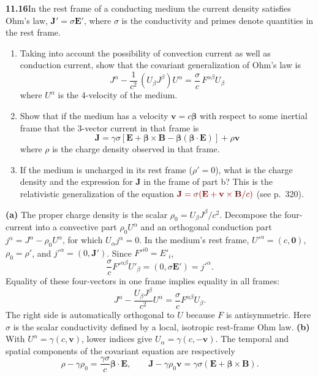 \par\bigskip
\noindent\textbf{11.16}\quad In the rest frame of a conducting medium the current density satisfies Ohm's law, $\mathbf{J}'=\sigma\mathbf{E}'$, where $\sigma$ is the conductivity and primes denote quantities in the rest frame.
\begin{enumerate}
\item[(a)] Taking into account the possibility of convection current as well as conduction current, show that the covariant generalization of Ohm's law is
\[
J^{\alpha}-\frac{1}{c^{2}}\,(U_{\beta}J^{\beta})U^{\alpha}=\frac{\sigma}{c}\,F^{\alpha\beta}U_{\beta}
\]
where $U^{\alpha}$ is the 4-velocity of the medium.
\item[(b)] Show that if the medium has a velocity $\mathbf{v}=c\boldsymbol{\beta}$ with respect to some inertial frame that the 3-vector current in that frame is
\[
\mathbf{J}=\gamma\sigma[\mathbf{E}+\boldsymbol{\beta}\times\mathbf{B}-\boldsymbol{\beta}(\boldsymbol{\beta}\cdot\mathbf{E})]+\rho\mathbf{v}
\]
where $\rho$ is the charge density observed in that frame.
\item[(c)] If the medium is uncharged in its rest frame ($\rho'=0$), what is the charge density and the expression for $\mathbf{J}$ in the frame of part b? This is the relativistic generalization of the equation $\erratum{\mathbf{J}=\sigma(\mathbf{E}+\mathbf{v}\times\mathbf{B}/c)}$ (see p.~320).
\end{enumerate}
\solution
\textbf{(a)} The proper charge density is the scalar
$\rho_0=U_\beta J^\beta/c^2$. Decompose the four-current into a
convective part $\rho_0 U^\alpha$ and an orthogonal conduction
part $j^\alpha=J^\alpha-\rho_0U^\alpha$, for which
$U_\alpha j^\alpha=0$. In the medium's rest frame,
$U'^\alpha=(c,\mathbf0)$, $\rho_0=\rho'$, and
$j'^\alpha=(0,\mathbf J')$. Since $F'^{i0}=E'_i$,
\[
\frac\sigma c F'^{\alpha\beta}U'_\beta
=(0,\sigma\mathbf E')=j'^\alpha.
\]
Equality of these four-vectors in one frame implies equality in
all frames:
\[
\boxed{J^\alpha-\frac{U_\beta J^\beta}{c^2}U^\alpha
=\frac\sigma c F^{\alpha\beta}U_\beta.}
\]
The right side is automatically orthogonal to $U$ because $F$ is
antisymmetric. Here $\sigma$ is the scalar conductivity defined
by a local, isotropic rest-frame Ohm law.
\textbf{(b)} With $U^\alpha=\gamma(c,\mathbf v)$, lower indices
 give $U_\alpha=\gamma(c,-\mathbf v)$. The temporal and spatial
components of the covariant equation are respectively
\[
\rho-\gamma\rho_0=\frac{\gamma\sigma}{c}
\boldsymbol\beta\cdot\mathbf E,
\qquad
\mathbf J-\gamma\rho_0\mathbf v
=\gamma\sigma(\mathbf E+\boldsymbol\beta\times\mathbf B).
\]
